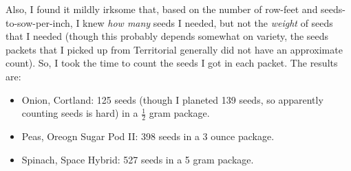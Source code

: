 \documentclass{article}
\begin{document}
Also, I found it mildly irksome that, based on the number of row-feet and seeds-to-sow-per-inch, I knew \textit{how many} seeds I needed, but not the \textit{weight} of seeds that I needed (though this probably depends somewhat on variety, the seeds packets that I picked up from Territorial generally did not have an approximate count). So, I took the time to count the seeds I got in each packet. The results are:
\begin{itemize}
	\item Onion, Cortland: 125 seeds (though I planeted 139 seeds, so apparently counting seeds is hard) in a $\frac{1}{2}$ gram package.
	\item Peas, Oreogn Sugar Pod II: 398 seeds in a 3 ounce package.
	\item Spinach, Space Hybrid: 527 seeds in a 5 gram package.
\end{itemize}
\end{document}
